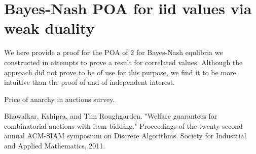 \documentclass[twoside,onecolumn]{article}
\begin{document}
\section{Bayes-Nash POA for iid values via weak duality} 
We here provide a proof for the POA of 2 for Bayes-Nash equlibria we constructed in attempts to prove a result for correlated values. Although the approach did not prove to be of use for this purpose, we find it to be more intuitive than the proof of \cite{survey} and of independent interest.
%
%
\begin{thebibliography}{9}
Price of anarchy in auctions survey.
 
 Bhawalkar, Kshipra, and Tim Roughgarden. "Welfare guarantees for combinatorial auctions with item bidding." Proceedings of the twenty-second annual ACM-SIAM symposium on Discrete Algorithms. Society for Industrial and Applied Mathematics, 2011.
 
\end{thebibliography}
\end{document}
